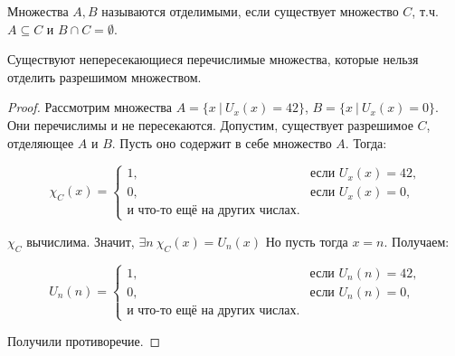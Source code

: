 \begin{definition}
  Множества $A, B$ называются отделимыми, если существует множество $C$, т.ч. $A \subseteq C$ и $B \cap C = \emptyset$.
\end{definition}

\begin{statement}
  Существуют непересекающиеся перечислимые множества, которые нельзя отделить разрешимом множеством.
  \begin{proof}
    Рассмотрим множества $A = \{x \> | \> U_x(x) = 42\}$, $B = \{x \> | \> U_x(x) = 0\}$. Они перечислимы и не пересекаются. 
    Допустим, существует разрешимое $C$, отделяющее $A$ и $B$. Пусть оно содержит в себе
        множество $A$. Тогда:

        $$
            \chi_C(x) =
            \begin{cases}
                1, & \text{если $U_x(x) = 42$,}\\
                0, & \text{если $U_x(x) = 0$,}\\
                \text{и что-то ещё на других числах.}
            \end{cases}
        $$

        $\chi_C$ вычислима. Значит, $\exists n \ \chi_C(x) = U_n(x)$ Но пусть тогда $x = n$.
        Получаем:

        $$
            U_n(n) =
            \begin{cases}
                1, & \text{если $U_n(n) = 42$,}\\
                0, & \text{если $U_n(n) = 0$,}\\
                \text{и что-то ещё на других числах.}
            \end{cases}
        $$

        Получили противоречие.
  \end{proof}
\end{statement}
